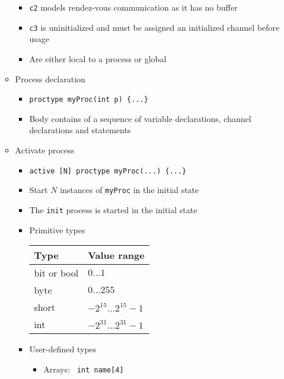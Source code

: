\begin{itemize}
\begin{itemize}
\begin{itemize}
                    \item \verb+c2+ models rendez-vous communication as it has no buffer
                    \item \verb+c3+ is uninitialized and must be assigned an initialized channel before usage
                    \item Are either local to a process or global
                \end{itemize}
            \item Process declaration
                \begin{itemize}
                    \item
\begin{verbatim}
proctype myProc(int p) {...}
\end{verbatim}
                    \item Body contains of a sequence of variable declarations, channel declarations and statements
                \end{itemize}
            \item Activate process
                \begin{itemize}
                    \item
\begin{verbatim}
active [N] proctype myProc(...) {...}
\end{verbatim}
                    \item Start $N$ instances of \verb+myProc+ in the initial state
                    \item The \verb+init+ process is started in the initial state
                \end{itemize}
                \begin{itemize}
                    \item Primitive types
\begin{tabular}{l | l}
    Type & Value range \\\hline
    bit or bool & $0 \dots 1$\\
    byte & $0 \dots 255$\\
    short & $-2^{15}\dots 2^{15}-1$\\
    int & $-2^{31}\dots 2^{31} - 1$
\end{tabular}
                    \item User-defined types
                        \begin{itemize}
                            \item Arrays: \verb+ int name[4]+

\end{itemize}
\end{itemize}
\end{itemize}
\end{itemize}
